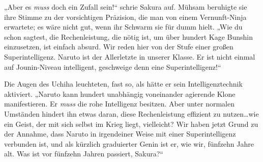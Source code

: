 „Aber es \emph{muss} doch ein Zufall sein!“ schrie Sakura auf. Mühsam beruhigte sie ihre Stimme zu der vorsichtigen Präzision, die man von einem Vernunft-Ninja erwartete; es wäre nicht gut, wenn ihr Schwarm sie für dumm hielt. „Wie du schon sagtest, die Rechenleistung, die nötig ist, um über hundert Kage Bunshin einzusetzen, ist einfach absurd. Wir reden hier von der Stufe einer großen Superintelligenz. Naruto ist der Allerletzte in unserer Klasse. Er ist nicht einmal auf Jounin-Niveau intelligent, geschweige denn eine Superintelligenz!“

Die Augen des Uchiha leuchteten, fast so, als hätte er sein Intelligenztechnik aktiviert. „Naruto kann hundert unabhängig voneinander agierende Klone manifestieren. Er \emph{muss} die rohe Intelligenz besitzen. Aber unter normalen Umständen hindert ihn etwas daran, diese Rechenleistung effizient zu nutzen…wie ein Geist, der mit sich selbst im Krieg liegt, vielleicht? Wir haben jetzt Grund zu der Annahme, dass Naruto in irgendeiner Weise mit einer Superintelligenz verbunden ist, und als kürzlich graduierter Genin ist er, wie wir, fünfzehn Jahre alt. Was ist vor fünfzehn Jahren passiert, Sakura?“

